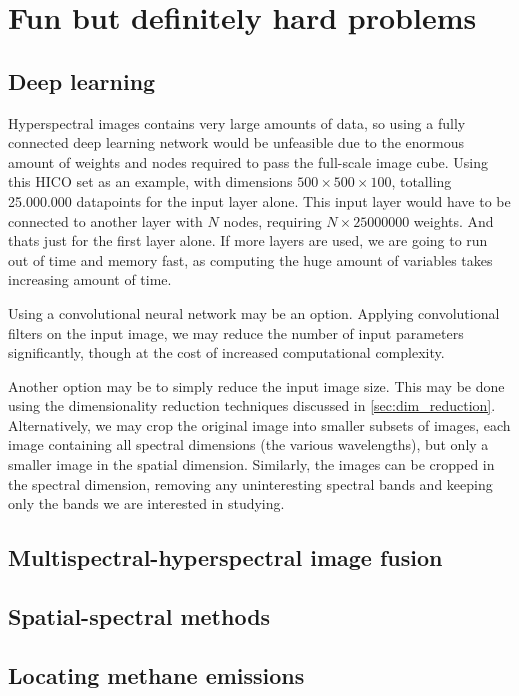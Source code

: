 \section{Fun but definitely hard problems}

\subsection{Deep learning}

Hyperspectral images contains very large amounts of data, so using a fully connected 
deep learning network would be unfeasible due to the enormous amount of weights and 
nodes required to pass the full-scale image cube. Using this HICO set as an example, 
with dimensions $500 \times 500 \times 100$, totalling 25.000.000 datapoints for the 
input layer alone. This input layer would have to be connected to another layer with 
$N$ nodes, requiring $N \times 25000000$ weights. And thats just for the first layer 
alone. If more layers are used, we are going to run out of time and memory fast, as 
computing the huge amount of variables takes increasing amount of time. 

Using a convolutional neural network may be an option. Applying convolutional filters 
on the input image, we may reduce the number of input parameters significantly, though 
at the cost of increased computational complexity. 

Another option may be to simply reduce the input image size. This may be done using 
the dimensionality reduction techniques discussed in \cref{sec:dim_reduction}. 
Alternatively, we may crop the original image into smaller subsets of images, each 
image containing all spectral dimensions (the various wavelengths), but only a smaller 
image in the spatial dimension. Similarly, the images can be cropped in the spectral 
dimension, removing any uninteresting spectral bands and keeping only the bands we are 
interested in studying. 

\subsection{Multispectral-hyperspectral image fusion}

\subsection{Spatial-spectral methods}

\subsection{Locating methane emissions}